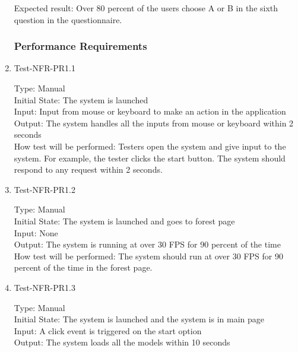 \documentclass[12pt, titlepage]{article}
\begin{document}
\begin{enumerate}
Expected result: Over 80 percent of the users choose A or B in the sixth question in the questionnaire.

\subsubsection{Performance Requirements}
\item{Test-NFR-PR1.1\\}

Type: Manual\\

Initial State: The system is launched\\

Input: Input from mouse or keyboard to make an action in the application\\

Output: The system handles all the inputs from mouse or keyboard within 2 seconds\\

How test will be performed: Testers open the system and give input to the system. For example, the tester clicks the start button. The system should respond to any request within 2 seconds.

\item{Test-NFR-PR1.2\\}

Type: Manual\\

Initial State: The system is launched and goes to forest page\\

Input: None\\

Output: The system is running at over 30 FPS for 90 percent of the time\\

How test will be performed:  The system should run at over 30 FPS for 90 percent of the time in the forest page.

\item{Test-NFR-PR1.3\\}

Type: Manual\\

Initial State: The system is launched and the system is in main page\\

Input: A click event is triggered on the start option\\

Output: The system loads all the models within 10 seconds\\


\end{enumerate}
\end{document}

